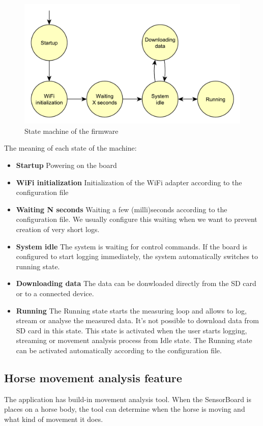 \begin{figure}
	\centering
	\label{firmwareStateMachine}
	\caption{State machine of the firmware}
	\includegraphics[width=16cm]{img/firmwareStateMachine.pdf}
\end{figure}

The meaning of each state of the machine:
\begin{itemize}
	\item \textbf{Startup} Powering on the board
	\item \textbf{WiFi initialization} Initialization of the WiFi adapter according to the configuration file
	\item \textbf{Waiting N seconds} Waiting a few (milli)seconds according to the configuration file. We usually configure this waiting when we want to prevent creation of very short logs.
	\item \textbf{System idle} The system is waiting for control commands. If the board is configured to start logging immediately, the system automatically switches to running state.
	\item \textbf{Downloading data} The data can be donwloaded directly from the SD card or to a connected device.
	\item \textbf{Running} The Running state starts the measuring loop and allows to log, stream or analyse the measured data. It's not possible to download data from SD card in this state. This state is activated when the user starts logging, streaming or movement analysis process from Idle state. The Running state can be activated automatically according to the configuration file.
\end{itemize}

\subsection{Horse movement analysis feature}
The application has build-in movement analysis tool. When the SensorBoard is places on a horse body, the tool can determine when the horse is moving and what kind of movement it does.

